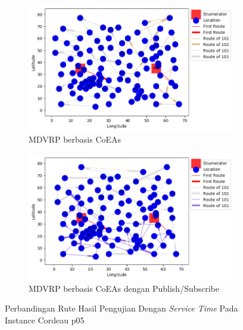 \begin{figure}[H]
	\centering
	\begin{subfigure}[t]{\textwidth}
		\centering
		\includegraphics[width=\textwidth]{Resources/Images/cordeau_p05_tw/cordeau_p05_tw_coes}
		\caption{MDVRP berbasis CoEAs}
		\label{fig:cordeau_p05_tw_coes}
	\end{subfigure}
	\begin{subfigure}[t]{\textwidth}
		\centering
		\includegraphics[width=\textwidth]{Resources/Images/cordeau_p05_tw/cordeau_p05_tw_pubsub_coes}
		\caption{MDVRP berbasis CoEAs dengan Publish/Subscribe}
		\label{fig:cordeau_p05_tw_pubsub_coes}
	\end{subfigure}
	\caption{Perbandingan Rute Hasil Pengujian Dengan \textit{Service Time} Pada Instance Cordeau p05}
	\label{fig:cordeau_p05_tw}
\end{figure}


